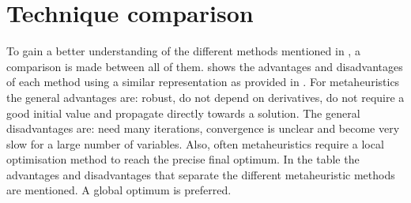 \section{Technique comparison}
\label{sec:techcomp}
To gain a better understanding of the different methods mentioned in  , a comparison is made between all of them.  shows the advantages and disadvantages of each method using a similar representation as provided in \cite{noomen2013}. For metaheuristics the general advantages are: robust, do not depend on derivatives, do not require a good initial value and propagate directly towards a solution. The general disadvantages are: need many iterations, convergence is unclear and become very slow for a large number of variables. Also, often metaheuristics require a local optimisation method to reach the precise final optimum. In the table the advantages and disadvantages that separate the different metaheuristic methods are mentioned. A global optimum is preferred.



